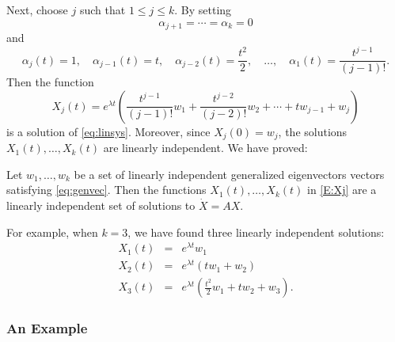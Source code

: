 \documentclass{ximera}
\begin{document}
Next, choose $j$ such that $1\le j\le k$.  By setting
\[ 
\alpha_{j+1} =  \cdots = \alpha_k = 0
\]
and 
\[
\alpha_j(t)=1, \quad \alpha_{j-1}(t)=t, \quad \alpha_{j-2}(t)=\frac{t^2}{2},
\quad \ldots, \quad\alpha_1(t)=\frac{t^{j-1}}{(j-1)!}.
\]
Then the function 
\begin{equation}  \label{E:Xj}
X_j(t)=e^{\lambda t} \left(\frac{t^{j-1}}{(j-1)!}w_1+\frac{t^{j-2}}{(j-2)!}w_2
+\cdots+tw_{j-1}+w_j\right)
\end{equation}
is a solution of \eqref{eq:linsys}.   Moreover, since $X_j(0)=w_j$, the 
solutions $X_1(t),\ldots,X_k(t)$ are linearly independent.  We have proved:
\begin{theorem}  \label{T:JBsoln}
Let $w_1,\ldots,w_k$ be a set of linearly independent generalized
eigenvectors vectors satisfying \eqref{eq:genvec}. Then the functions 
$X_1(t),\ldots,X_k(t)$ in \eqref{E:Xj} are a linearly independent set of 
solutions to $\dot{X}=AX$.
\end{theorem}

For example, when $k=3$, we have found three linearly independent solutions:
\begin{eqnarray*}
X_1(t)&=&e^{\lambda t} w_1\\
X_2(t)&=&e^{\lambda t} (tw_1+w_2)\\
X_3(t)&=&e^{\lambda t} \left(\frac{t^2}{2}w_1+tw_2+w_3\right).
\end{eqnarray*}


\subsubsection*{An Example}
\end{document}
